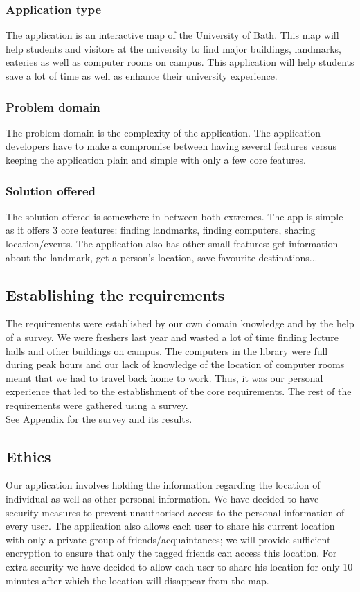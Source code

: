 \documentclass[10pt,a4paper,oneside]{report}
\begin{document}
\subsubsection*{Application type}
 The application is an interactive map of the University of Bath. This map will help students and visitors at the university to find major buildings, landmarks, eateries as well as computer rooms on campus. This application will help students save a lot of time as well as enhance their university experience.

\subsubsection*{Problem domain}
The problem domain is the complexity of the application. The application developers have to make a compromise between having several features versus keeping the application plain and simple with only a few core features.

\subsubsection*{Solution offered}
The solution offered is somewhere in between both extremes. The app is simple as it offers 3 core features: finding landmarks, finding computers, sharing location/events.
The application also has other small features: get information about the landmark, get a person’s location, save favourite destinations...
\subsection*{Establishing the requirements}
The requirements were established by our own domain knowledge and by the help of a survey.
We were freshers last year and wasted a lot of time finding lecture halls and other buildings on campus. The computers in the library were full during peak hours and our lack of knowledge of the location of computer rooms meant that we had to travel back home to work. Thus, it was our personal experience that led to the establishment of the core requirements. The rest of the requirements were gathered using a survey. \\

See Appendix for the survey and its results.

\subsection*{Ethics}
Our application involves holding the information regarding the location of individual as well as other personal information. We have decided to have security measures to prevent unauthorised access to the personal information of every user. The application also allows each user to share his current location with only a private group of friends/acquaintances; we will provide sufficient encryption to ensure that only the tagged friends can access this location. For extra security we have decided to allow each user to share his location for only 10 minutes after which the location will disappear from the map.
\end{document}
